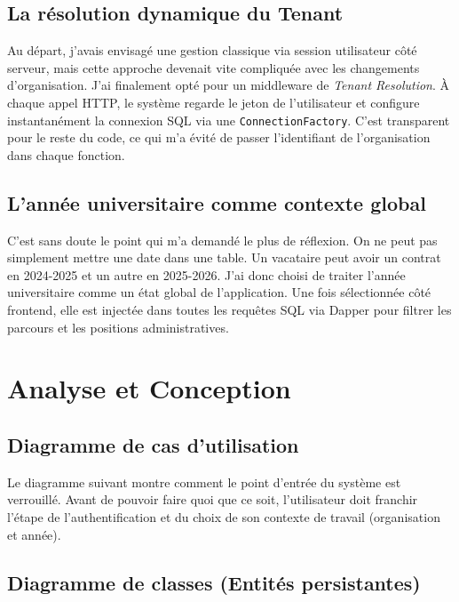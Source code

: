 \subsection{La résolution dynamique du Tenant}

Au départ, j'avais envisagé une gestion classique via session utilisateur côté serveur, mais cette approche devenait vite compliquée avec les changements d'organisation. J'ai finalement opté pour un middleware de \textit{Tenant Resolution}. À chaque appel HTTP, le système regarde le jeton de l'utilisateur et configure instantanément la connexion SQL via une \texttt{ConnectionFactory}. C'est transparent pour le reste du code, ce qui m'a évité de passer l'identifiant de l'organisation dans chaque fonction.

\subsection{L'année universitaire comme contexte global}

C'est sans doute le point qui m'a demandé le plus de réflexion. On ne peut pas simplement mettre une date dans une table. Un vacataire peut avoir un contrat en 2024-2025 et un autre en 2025-2026. J'ai donc choisi de traiter l'année universitaire comme un \og état global \fg{} de l'application. Une fois sélectionnée côté frontend, elle est injectée dans toutes les requêtes SQL via Dapper pour filtrer les parcours et les positions administratives.

\section{Analyse et Conception}

\subsection{Diagramme de cas d'utilisation}

Le diagramme suivant montre comment le point d'entrée du système est verrouillé. Avant de pouvoir faire quoi que ce soit, l'utilisateur doit franchir l'étape de l'authentification et du choix de son contexte de travail (organisation et année).


\subsection{Diagramme de classes (Entités persistantes)}

